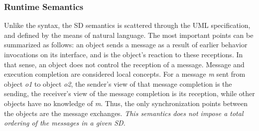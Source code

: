 \documentclass[letter]{llncs}
\newcommand{\subsecshrink}{\vspace{-.5cm}}
\newcommand{\subsecshrinkbegin}{\vspace{-.2cm}}
\begin{document}
\subsecshrinkbegin
\subsubsection{Runtime Semantics}
Unlike the syntax, the SD semantics is scattered through the UML specification, and defined by the means of natural language. 
The most important points can be summarized as follows: an object sends a message as a result of earlier behavior invocations 
on its interface, and is the object's reaction to these receptions. In that sense, an object does not control the reception of a message.
Message and execution completion are considered local concepts.
For a message \emph{m} sent from object \emph{o1} to object \emph{o2}, the sender's view of that message completion is 
the sending, the receiver's view of the message completion is its reception, while other objects have no knowledge of \emph{m}.
Thus, the only synchronization points between the objects are the message exchanges.
\emph{This semantics does not impose a total ordering of the messages in a given SD.}

\subsecshrink
\end{document}

